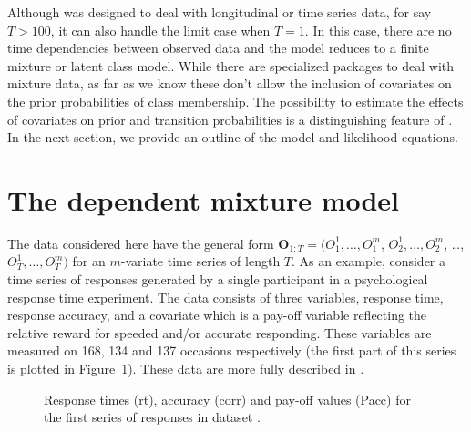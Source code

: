 \documentclass[article]{jss}
\newcommand{\vc}{\mathbf}
\begin{document}
Although  was designed to deal with longitudinal or time
series data, for say $T>100$, it can also handle the limit case when
$T=1$.  In this case, there are no time dependencies between
observed data and the model reduces to a finite mixture or
latent class model. While there are specialized packages to
deal with mixture data, as far as we know these 
don't allow the inclusion of covariates on the prior probabilities of
class membership. The possibility to estimate the effects of covariates on 
prior and transition probabilities is a distinguishing feature of 
. In the next section, we provide an outline of the model and 
likelihood equations.


\section{The dependent mixture model}

The data considered here have the general form $\vc{O}_{1:T}= (O_{1}^{1}, \ldots,
O_{1}^{m}$, $O_{2}^{1}, \ldots, O_{2}^{m}$, \ldots, $O_{T}^{1},
\ldots, O_{T}^{m})$ for an $m$-variate time series of length $T$.  As
an example, consider a time series of responses generated by a single
participant in a psychological response time experiment. The data consists of three
variables, response time, response accuracy, and a covariate which is a pay-off
variable reflecting the relative reward for speeded and/or accurate responding. 
These variables are measured on 168, 134 and 137 occasions respectively (the 
first part of this series is plotted in
Figure~\ref{fig:speed}). These data
are more fully described in \citet{Dutilh2009}. 

\begin{figure}[htbp]
  \begin{center}
	  \caption{Response times (rt), accuracy (corr) and pay-off values (Pacc) for
	  the first series of responses in dataset .}
	  \label{fig:speed}
  \end{center}
\end{figure}
\end{document}
